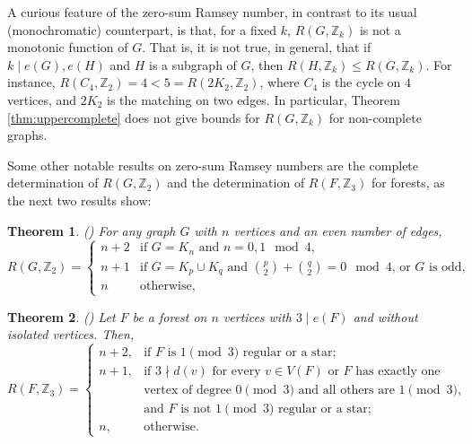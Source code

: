 \documentclass{article}
\numberwithin{table}{section}
\newtheorem{theorem}{Theorem}
\begin{document}
A curious feature of the zero-sum Ramsey number, in contrast to its usual (monochromatic) counterpart, is that, for a fixed $k$, $R(G,\mathbb{Z}_k)$ is not a monotonic function of $G$. That is, it is not true, in general, that if $k\mid e(G), e(H)$ and $H$ is a subgraph of $G$, then $R(H,\mathbb{Z}_k) \leq R(G,\mathbb{Z}_k)$. For instance, $R(C_4,\mathbb{Z}_2)=4<5=R(2K_2,\mathbb{Z}_2)$, where $C_4$ is the cycle on $4$ vertices, and $2K_2$ is the matching on two edges. In particular, Theorem \ref{thm:uppercomplete} does not give bounds for $R(G,\mathbb{Z}_k)$ for non-complete graphs.

Some other notable results on zero-sum Ramsey numbers are the complete determination of $R(G,\mathbb{Z}_2)$ and the determination of $R(F,\mathbb{Z}_3)$ for forests, as the next two results show:

\begin{theorem}\label{thm:exactz2}(\cite{caro1994complete})
For any graph $G$ with $n$ vertices and an even number of edges,
\begin{equation*}
    R(G, \mathbb{Z}_2) =
    \begin{cases}
        n + 2 & \text{if $G = K_n$ and $n = 0,1 \mod{4}$,} \\
        n + 1 & \text{if $G = K_p \cup K_q$ and $\binom{p}{2} + \binom{q}{2} = 0 \mod{4}$, or $G$ is odd,} \\
        n & \text{otherwise, }
    \end{cases}
\end{equation*}
\end{theorem}

    \begin{theorem}\label{thm:upeerz3}(\cite{alvarado2025problem})
    Let $F$ be a forest on $n$ vertices with $3\mid e(F)$ and without isolated vertices. Then,
    \begin{equation*}
    R(F,\mathbb{Z}_3)=\begin{cases}
			n+2, & \text{if $F$ is $1 \pmod 3$ regular or a star;}\\
            n+1, & \text{if $3\nmid d(v)$ for every $v \in V(F)$ or $F$ has exactly one}\\ 
            & \text{vertex of degree $0 \pmod 3$ and all others are $1 \pmod 3$,}\\ 
            & \text{and $F$ is not $1 \pmod 3$ regular or a star;}\\
            n, & \text{otherwise.}
		 \end{cases}
   \end{equation*}
\end{theorem}
\end{document}
